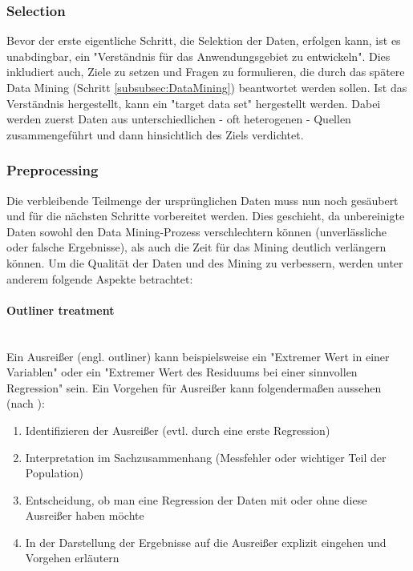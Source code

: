 \subsubsection{Selection}
Bevor der erste eigentliche Schritt, die Selektion der Daten, erfolgen kann, ist es unabdingbar, ein "Verständnis für das Anwendungsgebiet zu entwickeln".\citep[S.~42; eigene Übersetzung]{fayyad_data_1996} Dies inkludiert auch, Ziele zu setzen und Fragen zu formulieren, die durch das spätere Data Mining (Schritt \ref{subsubsec:DataMining}) beantwortet werden sollen.  Ist das Verständnis hergestellt, kann ein "target data set"\citep[S.~42]{fayyad_data_1996} hergestellt werden. Dabei werden zuerst Daten aus unterschiedlichen - oft heterogenen - Quellen zusammengeführt und dann hinsichtlich des Ziels verdichtet.\citep[S.~70]{swamynathan_mastering_2017}

\subsubsection{Preprocessing}
Die verbleibende Teilmenge der ursprünglichen Daten muss nun noch gesäubert und für die nächsten Schritte vorbereitet werden. Dies geschieht, da unbereinigte Daten sowohl den Data Mining-Prozess verschlechtern können (unverlässliche oder falsche Ergebnisse), als auch die Zeit für das Mining deutlich verlängern können.\citep[S.~70]{swamynathan_mastering_2017}
Um die Qualität der Daten und des Mining zu verbessern, werden unter anderem folgende Aspekte betrachtet:
\paragraph{Outliner treatment}\mbox{} \\
Ein Ausreißer (engl. outliner) kann beispielsweise ein "Extremer Wert in einer Variablen" oder ein "Extremer Wert des Residuums bei einer sinnvollen Regression"\citep[S.~25; Teil 5b]{hertle_datenanalyse_2016} sein. Ein Vorgehen für Ausreißer kann folgendermaßen aussehen (nach \citep[S.~25; Teil 5b]{hertle_datenanalyse_2016}):
\begin{enumerate}
\item Identifizieren der Ausreißer (evtl. durch eine erste Regression)
\item Interpretation im Sachzusammenhang (Messfehler oder wichtiger Teil der Population)
\item Entscheidung, ob man eine Regression der Daten mit oder ohne diese Ausreißer haben möchte
\item In der Darstellung der Ergebnisse auf die Ausreißer explizit eingehen und Vorgehen erläutern
\end{enumerate}

